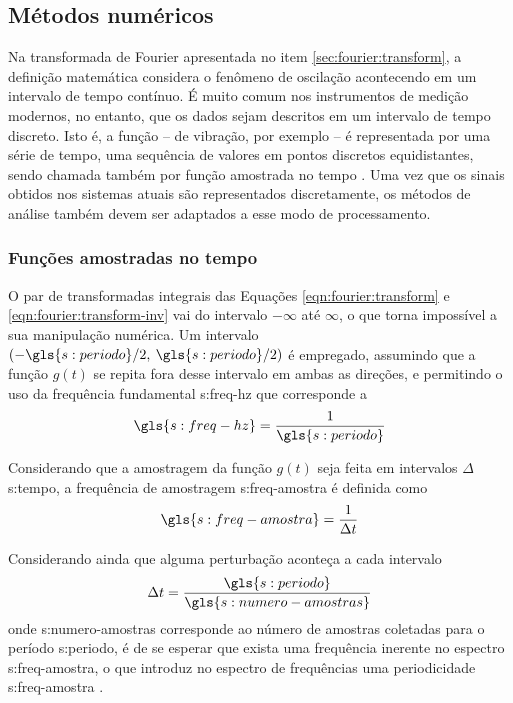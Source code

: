 \documentclass[12pt,oneside,english,brazil,lmodern,siglas,simbolos,cite=num]{ucsmonograph}
\begin{document}
	\subsection{Métodos numéricos}
	Na transformada de Fourier apresentada no item \ref{sec:fourier:transform}, a definição matemática considera o fenômeno de oscilação acontecendo em um intervalo de tempo contínuo.
	É muito comum nos instrumentos de medição modernos, no entanto, que os dados sejam descritos em um intervalo de tempo discreto.
	Isto é, a função -- de vibração, por exemplo -- é representada por uma série de tempo, uma sequência de valores em pontos discretos equidistantes, sendo chamada também por função amostrada no tempo \cite{dimarogonas:1995}.
	Uma vez que os sinais obtidos nos sistemas atuais são representados discretamente, os métodos de análise também devem ser adaptados a esse modo de processamento.
	
	\subsubsection{Funções amostradas no tempo}
	O par de transformadas integrais das Equações \ref{eqn:fourier:transform} e \ref{eqn:fourier:transform-inv} vai do intervalo $ -\infty $ até $ \infty $, o que torna impossível a sua manipulação numérica.
	Um intervalo $ (-\gls{s:periodo}/2,\:\gls{s:periodo}/2) $ é empregado, assumindo que a função $g(t)$ se repita fora desse intervalo em ambas as direções, e permitindo o uso da frequência fundamental \gls{s:freq-hz} que corresponde a \cite{dimarogonas:1995}
	\begin{equation} \label{eqn:fourier:freq-fundam}
		\gls{s:freq-hz} = \frac{1}{\gls{s:periodo}}
	\end{equation}
	
	Considerando que a amostragem da função $g(t)$ seja feita em intervalos $ \Delta $\gls{s:tempo}, a frequência de amostragem \gls{s:freq-amostra} é definida como \cite{dimarogonas:1995}
	\begin{equation} \label{eqn:fourier:freq-amostra}
		\gls{s:freq-amostra} = \frac{1}{\Delta t}
	\end{equation}
	
	Considerando ainda que alguma perturbação aconteça a cada intervalo \[\Delta t = \frac{\gls{s:periodo}}{\gls{s:numero-amostras}} \] onde \gls{s:numero-amostras} corresponde ao número de amostras coletadas para o período \gls{s:periodo}, é de se esperar que exista uma frequência inerente no espectro \gls{s:freq-amostra}, o que introduz no espectro de frequências uma periodicidade \gls{s:freq-amostra} \cite{dimarogonas:1995}.
	
\end{document}
